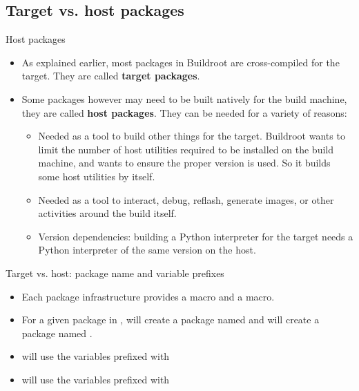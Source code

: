 \subsection{Target vs. host packages}

\begin{frame}{Host packages}

  \begin{itemize}
  \item As explained earlier, most packages in Buildroot are
    cross-compiled for the target. They are called {\bf target
      packages}.
  \item Some packages however may need to be built natively for the
    build machine, they are called {\bf host packages}. They can be
    needed for a variety of reasons:
    \begin{itemize}
    \item Needed as a tool to build other things for the
      target. Buildroot wants to limit the number of host utilities
      required to be installed on the build machine, and wants to ensure
      the proper version is used. So it builds some host utilities by
      itself.
    \item Needed as a tool to interact, debug, reflash, generate images,
      or other activities around the build itself.
    \item Version dependencies: building a Python interpreter for the
      target needs a Python interpreter of the same version on the
      host.
    \end{itemize}
  \end{itemize}
\end{frame}

\begin{frame}{Target vs. host: package name and variable prefixes}
  \begin{itemize}
  \item Each package infrastructure provides a 
    macro and a  macro.
  \item For a given package in ,
     will create a package named  and
     will create a package named
    .
  \item {} will use the variables prefixed with
  \item {} will use the variables prefixed with
  \end{itemize}
\end{frame}

